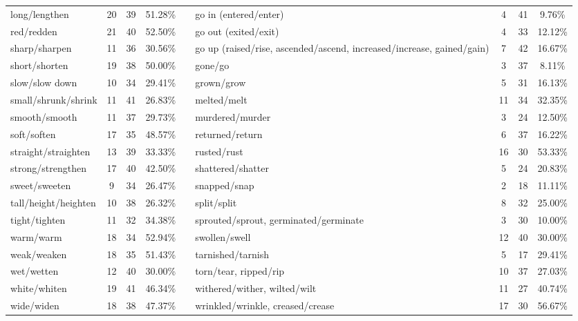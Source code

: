 \begin{tabular}{p{3cm}ccccp{3cm}ccc}
long/lengthen & 20 & 39 & 51.28\% & & go in (entered/enter) & 4 & 41 & 9.76\% \\
red/redden & 21 & 40 & 52.50\% & & go out (exited/exit) & 4 & 33 & 12.12\% \\
sharp/sharpen & 11 & 36 & 30.56\% & & go up (raised/rise, ascended/ascend, increased/increase, gained/gain) & 7 & 42 & 16.67\% \\
short/shorten & 19 & 38 & 50.00\% & & gone/go & 3 & 37 & 8.11\% \\
slow/slow down & 10 & 34 & 29.41\% & & grown/grow & 5 & 31 & 16.13\% \\
small/shrunk/shrink & 11 & 41 & 26.83\% & & melted/melt & 11 & 34 & 32.35\% \\
smooth/smooth & 11 & 37 & 29.73\% & & murdered/murder & 3 & 24 & 12.50\% \\
soft/soften & 17 & 35 & 48.57\% & & returned/return & 6 & 37 & 16.22\% \\
straight/straighten & 13 & 39 & 33.33\% & & rusted/rust & 16 & 30 & 53.33\% \\
strong/strengthen & 17 & 40 & 42.50\% & & shattered/shatter & 5 & 24 & 20.83\% \\
sweet/sweeten & 9 & 34 & 26.47\% & & snapped/snap & 2 & 18 & 11.11\% \\
tall/height/heighten & 10 & 38 & 26.32\% & & split/split & 8 & 32 & 25.00\% \\
tight/tighten & 11 & 32 & 34.38\% & & sprouted/sprout, germinated/germinate & 3 & 30 & 10.00\% \\
warm/warm & 18 & 34 & 52.94\% & & swollen/swell & 12 & 40 & 30.00\% \\
weak/weaken & 18 & 35 & 51.43\% & & tarnished/tarnish & 5 & 17 & 29.41\% \\
wet/wetten & 12 & 40 & 30.00\% & & torn/tear, ripped/rip & 10 & 37 & 27.03\% \\
white/whiten & 19 & 41 & 46.34\% & & withered/wither, wilted/wilt & 11 & 27 & 40.74\% \\
wide/widen & 18 & 38 & 47.37\% & & wrinkled/wrinkle, creased/crease & 17 & 30 & 56.67\%
\end{tabular}